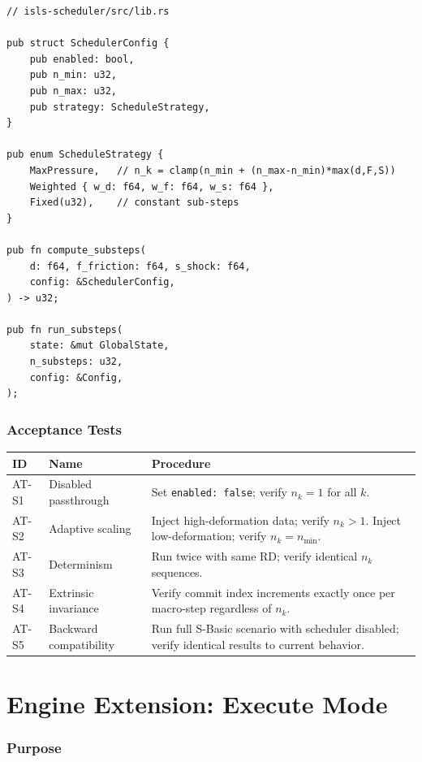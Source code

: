 \documentclass[11pt,a4paper,twoside]{article}
\theoremstyle{definition}
\theoremstyle{plain}
\theoremstyle{remark}
\begin{document}
\begin{verbatim}
// isls-scheduler/src/lib.rs

pub struct SchedulerConfig {
    pub enabled: bool,
    pub n_min: u32,
    pub n_max: u32,
    pub strategy: ScheduleStrategy,
}

pub enum ScheduleStrategy {
    MaxPressure,   // n_k = clamp(n_min + (n_max-n_min)*max(d,F,S))
    Weighted { w_d: f64, w_f: f64, w_s: f64 },
    Fixed(u32),    // constant sub-steps
}

pub fn compute_substeps(
    d: f64, f_friction: f64, s_shock: f64,
    config: &SchedulerConfig,
) -> u32;

pub fn run_substeps(
    state: &mut GlobalState,
    n_substeps: u32,
    config: &Config,
);
\end{verbatim}

\section{Acceptance Tests}\label{sec:sched:tests}

\begin{tabularx}{\textwidth}{l l X}
\toprule
\textbf{ID} & \textbf{Name} & \textbf{Procedure} \\
\midrule
AT-S1 & Disabled passthrough & Set \texttt{enabled: false}; verify
  $n_k = 1$ for all $k$. \\
AT-S2 & Adaptive scaling & Inject high-deformation data; verify
  $n_k > 1$. Inject low-deformation; verify $n_k = n_{\min}$. \\
AT-S3 & Determinism & Run twice with same RD; verify identical $n_k$
  sequences. \\
AT-S4 & Extrinsic invariance & Verify commit index increments exactly
  once per macro-step regardless of $n_k$. \\
AT-S5 & Backward compatibility & Run full S-Basic scenario with
  scheduler disabled; verify identical results to current behavior. \\
\bottomrule
\end{tabularx}


\part{Engine Extension: Execute Mode}\label{part:execute}

\section{Purpose}\label{sec:exec:purpose}
\end{document}
